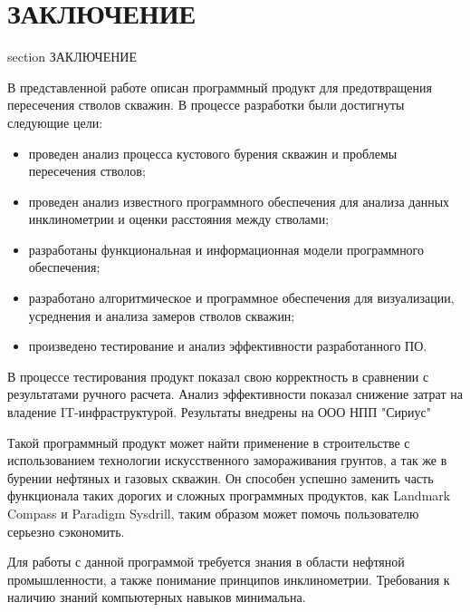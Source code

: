 \newpage
\section*{ЗАКЛЮЧЕНИЕ}
 {section} {ЗАКЛЮЧЕНИЕ}

В представленной работе описан программный продукт для предотвращения пересечения стволов скважин.
В процессе разработки были достигнуты следующие цели:

\begin{itemize}
  \item проведен анализ процесса кустового бурения скважин и проблемы пересечения стволов;
  \item проведен анализ известного программного обеспечения для анализа данных инклинометрии и оценки расстояния между стволами;
  \item разработаны функциональная и информационная модели программного обеспечения;
  \item разработано алгоритмическое и программное обеспечения для визуализации, усреднения и анализа замеров стволов скважин;
  \item произведено тестирование и анализ эффективности разработанного ПО.
\end{itemize}

В процессе тестирования продукт показал свою корректность в сравнении с результатами ручного расчета. Анализ эффективности показал
снижение затрат на владение IT-инфраструктурой. Результаты внедрены на ООО НПП "Сириус"

Такой программный продукт может найти применение в строительстве с использованием технологии искусственного замораживания
грунтов, а так же в бурении нефтяных и газовых скважин. Он способен успешно заменить часть функционала таких дорогих и сложных
программных продуктов, как Landmark Compass и Paradigm Sysdrill, таким образом может помочь пользователю серьезно сэкономить.

Для работы с данной программой требуется знания в области нефтяной промышленности, а также понимание принципов инклинометрии.
Требования к наличию знаний компьютерных навыков минимальна.
